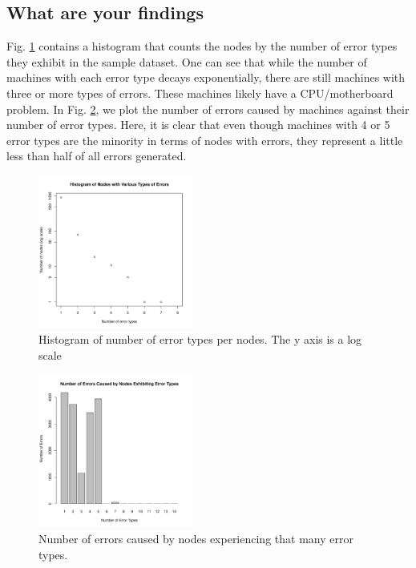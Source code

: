 \subsection{What are your findings}
Fig. \ref{fig:taskx} contains a histogram that counts the nodes by 
the number of error types they exhibit in the sample dataset.  One can see that
while the number of machines with each error type decays exponentially, there
are still machines with three or more types of errors.  These machines likely
have a CPU/motherboard problem.  In Fig. \ref{fig:taskx_types}, we plot the
number of errors caused by machines against their number of error types.  Here,
it is clear that even though machines with 4 or 5 error types are the minority
in terms of nodes with errors, they represent a little less than half of all
errors generated.
\begin{figure}[h]
  \centering
  \includegraphics[width=0.45\textwidth]{images/taskx}
  \caption{Histogram of number of error types per nodes. The y axis is a log
  scale}\label{fig:taskx}
\end{figure}
\begin{figure}[h]
  \centering
  \includegraphics[width=0.45\textwidth]{images/task_x_types}
  \caption{Number of errors caused by nodes experiencing that many error types.
  }\label{fig:taskx_types}
\end{figure}
